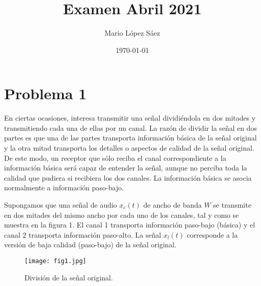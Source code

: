 \documentclass{article}
\begin{document}
\title{Examen Abril 2021}
\author{Mario López Sáez}
\date{\today}
\maketitle

\begin{center}

\end{center}

\section{Problema 1}
\begin{flushleft}
    
En ciertas ocasiones, interesa transmitir una señal dividiéndola en dos mitades y transmitiendo cada una de ellas por un canal. La razón de dividir la señal en dos partes es que una de las partes transporta información básica de la señal original y la otra mitad transporta los detalles o aspectos de calidad de la señal original. De este modo, un receptor que sólo reciba el canal correspondiente a la información básica será capaz de entender la señal, aunque no perciba toda la calidad que pudiera si recibiera los dos canales. La información básica se asocia normalmente a información paso-bajo. \newline


Supongamos que una señal de audio \( x_c(t) \) de ancho de banda \( W \) se transmite en dos mitades del mismo ancho por cada uno de los canales, tal y como se muestra en la figura 1. El canal 1 transporta información paso-bajo (básica) y el canal 2 transporta información paso-alto. La señal \( x_l(t) \) corresponde a la versión de baja calidad (paso-bajo) de la señal original.


\end{flushleft}

\begin{figure}[h!]
    \centering
    \texttt{[image: fig1.jpg]} 
    \caption{División de la señal original.}
    \label{fig:ejemplo}
\end{figure}
\end{document}
